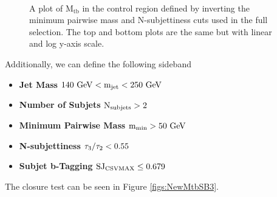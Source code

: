 \begin{figure}[Htcb]
\centering
{}\\
\caption{A plot of $\mathrm{M_{tb}}$ in the control region defined by inverting the minimum pairwise mass and N-subjettiness cuts used in the full selection.  The top and bottom plots are the same but with linear and log y-axis scale.}
\label{figs:NewMtbSB2}
\end{figure}

Additionally, we can define the following sideband 
\begin{itemize}
\item {\bf Jet Mass}  $\mathrm{\boldmath 140~\mathrm{GeV} < m_{\text{jet}} < 250~\mathrm{GeV}}$ 
\item {\bf Number of Subjets}  $\mathrm{\boldmath N_{\text{subjets}} > 2}$ 
\item {\bf Minimum Pairwise Mass} $\mathrm{\boldmath m_{\text{min}} > 50~\mathrm{GeV}}$ 
\item {\bf N-subjettiness} $\mathrm{\boldmath \tau_3/\tau_2 < 0.55}$ 
\item {\bf Subjet b-Tagging} $\mathrm{\boldmath SJ_{\text{CSVMAX}} \leq 0.679}$ 
\end{itemize}
The closure test can be seen in Figure \ref{figs:NewMtbSB3}.

